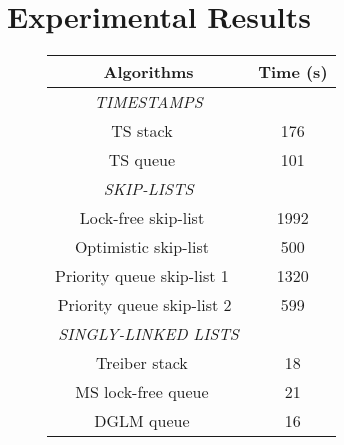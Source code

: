 \section{Experimental Results}
\label{section:experiments}
\newcommand{\emm}{(emm)}
\begin{figure}[]
\center



\begin{tabular}{|c | c | }
  \hline
   \textsf{{\textbf{Algorithms}}} &  \textsf{{\textbf{Time (s)}}} \\
\hline
\textsf{{\textit{TIMESTAMPS}}} & \\
\hline
\textsf{TS stack  ~\cite{MS:QueueAlgorithms}}  & \textsf{176} \\
\textsf{TS queue  ~\cite{MS:QueueAlgorithms}}& \textsf{101} \\
\hline
 \textsf{{\textit{SKIP-LISTS}}} &   \\
\hline
\textsf{Lock-free skip-list   ~\cite{ArtOfMpP}}& \textsf{1992} \\

\textsf{Optimistic skip-list ~\cite{MS:QueueAlgorithms}}& \textsf{500} \\
 
\textsf{Priority queue skip-list 1 ~\cite{Shavit:ElimQueue}}  &  \textsf{1320} \\

\textsf{Priority queue skip-list 2~\cite{Shavit:ElimQueue}}  &  \textsf{599} \\
\hline
   \textsf{{\textit{SINGLY-LINKED LISTS}}} &   \\
\hline
\textsf{Treiber stack  ~\cite{Treiber:stack}} & \textsf {18} \\

\textsf{MS lock-free queue  ~\cite{MS:QueueAlgorithms}}& \textsf{21} \\

\textsf{DGLM queue  ~\cite{Doherty:lockfree}}&  \textsf {16} \\


\end{tabular}
\end{figure}
